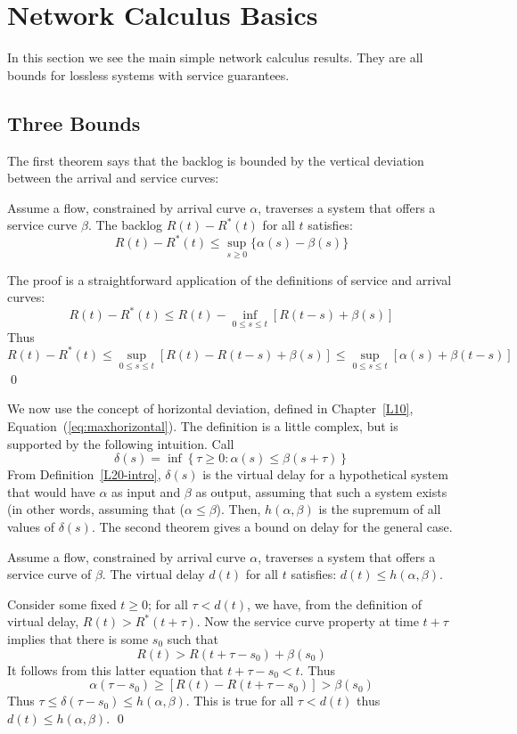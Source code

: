 \section{Network Calculus Basics}
 In this section we see the main simple network
calculus results. They are all bounds for lossless systems with
service guarantees.

\subsection{Three Bounds}
The first theorem says that the backlog is
bounded by the vertical deviation between the arrival and service
curves:
\begin{theorem}
Assume a flow, constrained by arrival curve $\alpha$, traverses a
system that offers a service curve $\beta$.  The backlog
$R(t)-R^{*}(t)$ for all $t$ satisfies: $$R(t)-R^{*}(t) \leq
\sup_{s \geq 0} \{\alpha(s) - \beta(s) \}$$
\end{theorem}
\pr The proof is a straightforward application of the definitions
of service and arrival curves:
$$R(t) - R^{*}(t)
\leq R(t) - \inf_{0 \leq s \leq t} [R(t-s) + \beta(s)]$$ Thus
$$R(t) - R^{*}(t) \leq \sup_{0 \leq s \leq t}[R(t) -
R(t-s) + \beta(s)] \leq \sup_{0 \leq s \leq t}[\alpha(s) +
\beta(t-s)]$$ \qed

We now use the concept of horizontal deviation, defined in
Chapter~\ref{L10}, Equation~(\ref{eq:maxhorizontal}). The
definition is a little complex, but is supported by the following
intuition. Call $$\delta(s)=\inf \left\{ \tau \geq 0:\alpha(s)
\leq \beta(s + \tau) \right\}$$ From Definition~\ref{L20-intro},
$\delta(s)$ is the virtual delay for a hypothetical system that
would have $\alpha$ as input and $\beta$ as output, assuming that
such a system exists (in other words, assuming that ($\alpha \leq
\beta$). Then,  $h(\alpha, \beta)$ is the supremum of all values
of $\delta(s)$. The second theorem gives a bound on delay for the
general case.
\begin{theorem}
Assume a flow, constrained by arrival curve $\alpha$, traverses a
system that offers a service curve of $\beta$.  The virtual delay
$d(t)$ for all $t$ satisfies: $d(t) \leq h( \alpha,\beta)$.
\end{theorem}
\pr Consider some fixed $t\geq 0$; for all $\tau < d(t)$, we have,
from the definition of  virtual delay, $R(t) > R^*(t+ \tau)$. Now
the service curve property at time $t+ \tau$ implies that there is
some $s_0$ such that
$$
R(t) > R(t + \tau - s_0) + \beta(s_0)
$$
It follows from this latter equation that $t + \tau - s_0 < t$.
Thus
$$
\alpha(\tau - s_0) \geq [R(t) - R(t + \tau - s_0)] > \beta(s_0)
$$
Thus $\tau \leq \delta(\tau - s_0)\leq h( \alpha,\beta)$. This is
true for all $\tau < d(t)$ thus $ d(t)\leq h( \alpha,\beta)$. \qed

